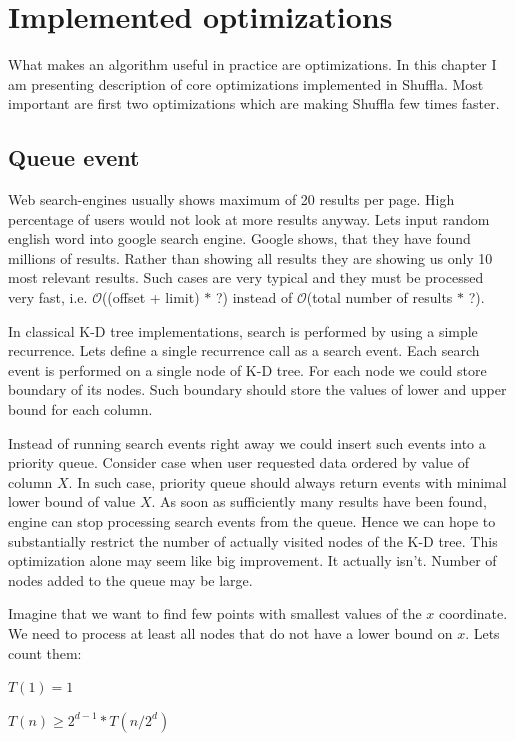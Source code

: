 \documentclass[10pt,a4paper]{article}
\newcommand{\Oh}{\mathcal{O}}
\begin{document}
\section{Implemented optimizations}

What makes an algorithm useful in practice are optimizations. In this chapter I am presenting description of core optimizations implemented in Shuffla. Most important are first two optimizations which are making Shuffla few times faster.

\subsection{Queue event}
Web search-engines usually shows maximum of 20 results per page. High percentage of users would not look at more results anyway. Lets input random english word into google search engine. Google shows, that they have found millions of results. Rather than showing all results they are showing us only 10 most relevant results. Such cases are very typical and they must be processed very fast, i.e. $\Oh$((offset + limit) $*$ ?) instead of $\Oh$(total number of results $*$ ?).

In classical K-D tree implementations, search is performed by using a simple recurrence. Lets define a single recurrence call as a search event. Each search event is performed on a single node of K-D tree. For each node we could store boundary of its nodes. Such boundary should store the values of lower and upper bound for each column.

Instead of running search events right away we could insert such events into a priority queue. Consider case when user requested data ordered by value of column $X$. In such case, priority queue should always return events with minimal lower bound of value $X$. As soon as sufficiently many results have been found, engine can stop processing search events from the queue. Hence we can hope to substantially restrict the number of actually visited nodes of the K-D tree. This optimization alone may seem like big improvement. It actually isn't. Number of nodes added to the queue may be large.

Imagine that we want to find few points with smallest values of the $x$ coordinate. We need to process at least all nodes
that do not have a lower bound on $x$. Lets count them:
\bigskip

$T(1) = 1$

$T(n) \geq 2^{d-1} * T(n/2^{d})$

\bigskip
\end{document}

